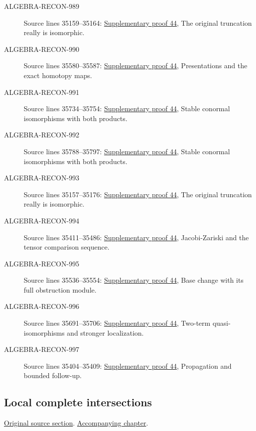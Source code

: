 \begin{description}
\item[ALGEBRA-RECON-989] Source lines 35159--35164: \hyperlink{algebra_naive_cotangent_notes_20260928}{Supplementary proof 44}, The original truncation really is isomorphic.
\item[ALGEBRA-RECON-990] Source lines 35580--35587: \hyperlink{algebra_naive_cotangent_notes_20260928}{Supplementary proof 44}, Presentations and the exact homotopy maps.
\item[ALGEBRA-RECON-991] Source lines 35734--35754: \hyperlink{algebra_naive_cotangent_notes_20260928}{Supplementary proof 44}, Stable conormal isomorphisms with both products.
\item[ALGEBRA-RECON-992] Source lines 35788--35797: \hyperlink{algebra_naive_cotangent_notes_20260928}{Supplementary proof 44}, Stable conormal isomorphisms with both products.
\item[ALGEBRA-RECON-993] Source lines 35157--35176: \hyperlink{algebra_naive_cotangent_notes_20260928}{Supplementary proof 44}, The original truncation really is isomorphic.
\item[ALGEBRA-RECON-994] Source lines 35411--35486: \hyperlink{algebra_naive_cotangent_notes_20260928}{Supplementary proof 44}, Jacobi-Zariski and the tensor comparison sequence.
\item[ALGEBRA-RECON-995] Source lines 35536--35554: \hyperlink{algebra_naive_cotangent_notes_20260928}{Supplementary proof 44}, Base change with its full obstruction module.
\item[ALGEBRA-RECON-996] Source lines 35691--35706: \hyperlink{algebra_naive_cotangent_notes_20260928}{Supplementary proof 44}, Two-term quasi-isomorphisms and stronger localization.
\item[ALGEBRA-RECON-997] Source lines 35404--35409: \hyperlink{algebra_naive_cotangent_notes_20260928}{Supplementary proof 44}, Propagation and bounded follow-up.
\end{description}

\subsection{Local complete intersections}
\hypertarget{algebra-source-section-lci}{}
\noindent\href{https://github.com/stacks/stacks-project/blob/a04446e57ec1fbc252a871afcec7752fb2807b14/algebra.tex\#L35805}{Original source section}. \href{algebra.pdf\#nameddest=section-lci}{Accompanying chapter}.


